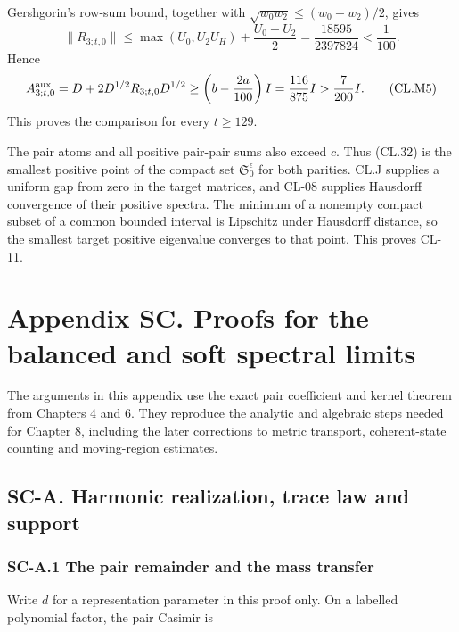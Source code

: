 Gershgorin's row-sum bound, together with \(\sqrt{w_0w_2}\leq(w_0+w_2)/2\), gives \[
\|R_{3;t,0}\|
\leq\max(U_0,U_2U_H)+\frac{U_0+U_2}{2}
=\frac{18595}{2397824}<\frac1{100}.
\tag{CL.M4}
\] Hence \[
A_{3;t,0}^{\rm aux}=D+2D^{1/2}R_{3;t,0}D^{1/2}
\geq\left(b-\frac{2a}{100}\right)I
=\frac{116}{875}I>\frac7{200}I.
\tag{CL.M5}
\] This proves the comparison for every \(t\geq129\).

The pair atoms and all positive pair-pair sums also exceed \(c\). Thus (CL.32) is the smallest positive point of the compact set \(\mathfrak S_0^\epsilon\) for both parities. CL.J supplies a uniform gap from zero in the target matrices, and CL-08 supplies Hausdorff convergence of their positive spectra. The minimum of a nonempty compact subset of a common bounded interval is Lipschitz under Hausdorff distance, so the smallest target positive eigenvalue converges to that point. This proves CL-11.

\clearpage
\hypertarget{appendix-sc.-proofs-for-the-balanced-and-soft-spectral-limits}{%
\section{Appendix SC. Proofs for the balanced and soft spectral limits}\label{appendix-sc.-proofs-for-the-balanced-and-soft-spectral-limits}}

The arguments in this appendix use the exact pair coefficient and kernel theorem from Chapters 4 and 6. They reproduce the analytic and algebraic steps needed for Chapter 8, including the later corrections to metric transport, coherent-state counting and moving-region estimates.

\hypertarget{sc-a.-harmonic-realization-trace-law-and-support}{%
\subsection{SC-A. Harmonic realization, trace law and support}\label{sc-a.-harmonic-realization-trace-law-and-support}}

\hypertarget{sc-a.1-the-pair-remainder-and-the-mass-transfer}{%
\subsubsection{SC-A.1 The pair remainder and the mass transfer}\label{sc-a.1-the-pair-remainder-and-the-mass-transfer}}

Write \(d\) for a representation parameter in this proof only. On a labelled polynomial factor, the pair Casimir is

